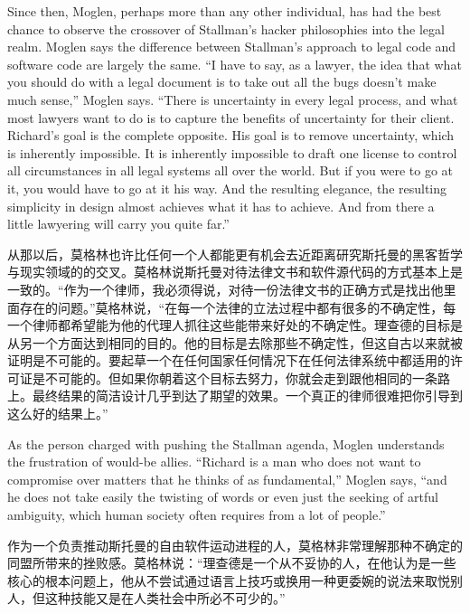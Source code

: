 \ifdefined\eng
Since then, Moglen, perhaps more than any other individual, has had the best chance to observe the crossover of Stallman's hacker philosophies into the legal realm. Moglen says the difference between Stallman's approach to legal code and software code are largely the same. ``I have to say, as a lawyer, the idea that what you should do with a legal document is to take out all the bugs doesn't make much sense,'' Moglen says. ``There is uncertainty in every legal process, and what most lawyers want to do is to capture the benefits of uncertainty for their client. Richard's goal is the complete opposite. His goal is to remove uncertainty, which is inherently impossible. It is inherently impossible to draft one license to control all circumstances in all legal systems all over the world. But if you were to go at it, you would have to go at it his way. And the resulting elegance, the resulting simplicity in design almost achieves what it has to achieve. And from there a little lawyering will carry you quite far.''
\fi

\ifdefined\chs
从那以后，莫格林也许比任何一个人都能更有机会去近距离研究斯托曼的黑客哲学与现实领域的的交叉。莫格林说斯托曼对待法律文书和软件源代码的方式基本上是一致的。``作为一个律师，我必须得说，对待一份法律文书的正确方式是找出他里面存在的问题。''莫格林说，``在每一个法律的立法过程中都有很多的不确定性，每一个律师都希望能为他的代理人抓往这些能带来好处的不确定性。理查德的目标是从另一个方面达到相同的目的。他的目标是去除那些不确定性，但这自古以来就被证明是不可能的。要起草一个在任何国家任何情况下在任何法律系统中都适用的许可证是不可能的。但如果你朝着这个目标去努力，你就会走到跟他相同的一条路上。最终结果的简洁设计几乎到达了期望的效果。一个真正的律师很难把你引导到这么好的结果上。''
\fi

\ifdefined\eng
As the person charged with pushing the Stallman agenda, Moglen understands the frustration of would-be allies. ``Richard is a man who does not want to compromise over matters that he thinks of as fundamental,'' Moglen says, ``and he does not take easily the twisting of words or even just the seeking of artful ambiguity, which human society often requires from a lot of people.''
\fi

\ifdefined\chs
作为一个负责推动斯托曼的自由软件运动进程的人，莫格林非常理解那种不确定的同盟所带来的挫败感。莫格林说：``理查德是一个从不妥协的人，在他认为是一些核心的根本问题上，他从不尝试通过语言上技巧或换用一种更委婉的说法来取悦别人，但这种技能又是在人类社会中所必不可少的。''
\fi


